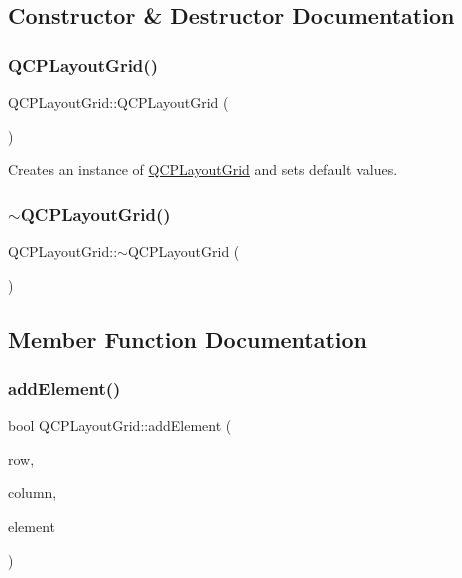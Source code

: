 \subsection{Constructor \& Destructor Documentation}
\mbox{\label{class_q_c_p_layout_grid_ab2a4c1587dc8aed4c41c509c8d8d2a64}} 
\subsubsection{\texorpdfstring{QCPLayoutGrid()}{QCPLayoutGrid()}}
{\footnotesize\ttfamily Q\+C\+P\+Layout\+Grid\+::\+Q\+C\+P\+Layout\+Grid (\begin{DoxyParamCaption}{ }\end{DoxyParamCaption})\hspace{0.3cm}{\ttfamily [explicit]}}

Creates an instance of \mbox{\hyperlink{class_q_c_p_layout_grid}{Q\+C\+P\+Layout\+Grid}} and sets default values. \mbox{\label{class_q_c_p_layout_grid_af859f4a4db693a21056a9e615f6c4a90}} 
\subsubsection{\texorpdfstring{$\sim$QCPLayoutGrid()}{~QCPLayoutGrid()}}
{\footnotesize\ttfamily Q\+C\+P\+Layout\+Grid\+::$\sim$\+Q\+C\+P\+Layout\+Grid (\begin{DoxyParamCaption}{ }\end{DoxyParamCaption})\hspace{0.3cm}{\ttfamily [virtual]}}



\subsection{Member Function Documentation}
\mbox{\label{class_q_c_p_layout_grid_adff1a2ca691ed83d2d24a4cd1fe17012}} 
\subsubsection{\texorpdfstring{addElement()}{addElement()}\hspace{0.1cm}{\footnotesize\ttfamily [1/2]}}
{\footnotesize\ttfamily bool Q\+C\+P\+Layout\+Grid\+::add\+Element (\begin{DoxyParamCaption}\item[{int}]{row,  }\item[{int}]{column,  }\item[{\mbox{\hyperlink{class_q_c_p_layout_element}{Q\+C\+P\+Layout\+Element}} $\ast$}]{element }\end{DoxyParamCaption})}

